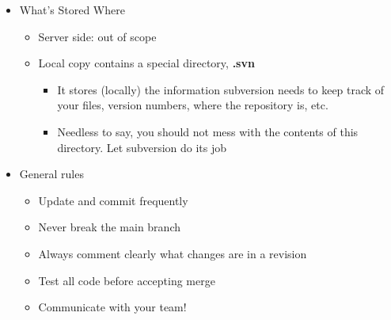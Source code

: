 \begin{itemize}
		\item What’s Stored Where
		\begin{itemize}
			\item Server side: out of scope
			\item Local copy contains a special directory, \textbf{.svn}
			\begin{itemize}
				\item It stores (locally) the information subversion needs to keep track of your files, version numbers, where the repository is, etc.
				\item Needless to say, you should not mess with the contents of this directory. Let subversion do its job
			\end{itemize}
		\end{itemize}

		\item General rules
		\begin{itemize}
			\item Update and commit frequently
			\item Never break the main branch
			\item Always comment clearly what changes are in a revision
			\item Test all code before accepting merge
			\item Communicate with your team!
		\end{itemize}
	\end{itemize}
